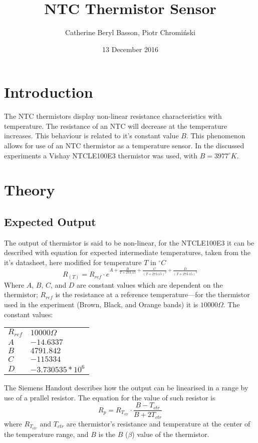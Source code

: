 \documentclass[a4,11pt]{article}
\begin{document}
\title{NTC Thermistor Sensor}
\author{Catherine Beryl Basson, Piotr Chromi\'nski}
\date{13 December 2016}
\maketitle
\twocolumn
\section{Introduction}

The NTC thermistors display non-linear resistance characteristics with temperature. The resistance of an NTC will decrease at the temperature increases. This behaviour is related to it's constant value $B$. This phenomenon allows for use of an NTC thermistor as a temperature sensor. In the discussed experiments a Vishay NTCLE100E3 thermistor was used, with $B=3977^{\circ}K$.

\section{Theory}
\subsection{Expected Output}
The output of thermistor is said to be non-linear, for the NTCLE100E3 it can be described with equation for expected intermediate temperatures, taken from the it's datasheet, here modified for temperature $T$ in $^{\circ}C$
$$R_{(T)}=R_{ref}\cdot e^{A+\frac{B}{T+273.15}+\frac{C}{(T+273.15)^2}+\frac{D}{(T+273.15)^3}}$$
Where $A$, $B$, $C$, and $D$ are constant values which are dependent on the thermistor; $R_{ref}$ is the resistance at a reference temperature---for the thermistor used in the experiment (Brown, Black, and Orange bands) it is $10000\Omega$. The constant values:
\begin{center}
  \begin{tabular}{ll}
    \hline 
    $R_{ref}$  &  $10000\Omega$  \\
    $A$  &  $-14.6337$  \\
    $B$  &  $4791.842$  \\
    $C$  &  $-115334$  \\
    $D$  &  $-3.730535*10^6$  \\
    \hline
  \end{tabular}
\end{center}
The Siemens Handout describes how the output can be linearised in a range by use of a prallel resistor. The equation for the value of such resistor is
$$R_p=R_{T_{ctr}}\cdot\frac{B-T_{ctr}}{B+2T_{ctr}}$$
where $R_{T_{ctr}}$ and $T_{ctr}$ are thermistor's resistance and temperature at the center of the temperature range, and $B$ is the $B$ ($\beta$) value of the thermistor.
\end{document}
